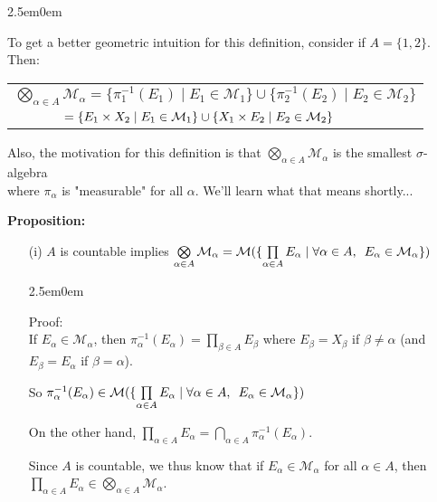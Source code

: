 \documentclass{book}
\newcommand{\hTwo}{%
\color{MidnightBlue}%
   \fontsize{13}{15}\selectfont%
}
\newcommand{\hThree}{%
   \color{PineGreen!85!Orange}
   \fontsize{12}{14}\selectfont%
}
\newcommand{\myComment}{%
   \color{RawerSienna}%
   \fontsize{12}{14}\selectfont%
}
\newenvironment{myIndent}{%
   \begin{adjustwidth}{2.5em}{0em}%
}{%
   \end{adjustwidth}%
}
\newcommand{\blab}[1]{\textbf{#1}}
\newcommand{\myHS}{ \hspace{0.5em}}
\newcommand{\retTwo}{\hfill\bigbreak}
\begin{document}
\begin{myIndent}\myComment
   To get a better geometric intuition for this definition, consider if $A = \{1, 2\}$. Then:\\ [-8pt]

   {\centering 
   \begin{tabular}{l}
      $\bigotimes\limits_{\alpha \in A}\mathcal{M}_\alpha = \{\pi_1^{-1}(E_1) \mid E_1 \in \mathcal{M}_1\} \cup \{\pi_2^{-1}(E_2) \mid E_2 \in \mathcal{M}_2\}$ \\ [-4pt]$\hphantom{\bigotimes\limits_{\alpha \in A}\mathcal{M}_\alpha} = \{E_1 \times X_2 \mid E_1 \in \mathcal{M}_1\} \cup \{X_1 \times E_2 \mid E_2 \in \mathcal{M}_2\}$
   \end{tabular} \retTwo\par}

   Also, the motivation for this definition is that $\bigotimes\limits_{\alpha \in A}\mathcal{M}_\alpha$ is the smallest $\sigma$-algebra\\ [-2pt] where $\pi_\alpha$ is "measurable" for all $\alpha$. We'll learn what that means shortly...\retTwo

   \hTwo
   \blab{Proposition:}
   \begin{itemize}
      \item[(i)] $A$ is countable implies $\bigotimes\limits_{\alpha \in A}\mathcal{M}_\alpha = \mathcal{M}(\{\prod\limits_{\alpha \in A}E_\alpha \mid \forall \alpha \in A, \myHS E_\alpha \in \mathcal{M}_\alpha\})$
      
      \begin{myIndent}\hThree
         Proof:\\
         If $E_\alpha \in \mathcal{M}_\alpha$, then $\pi_\alpha^{-1}(E_\alpha) = \prod\limits_{\beta \in A}E_\beta$ where $E_\beta = X_\beta$ if $\beta \neq \alpha$ (and\\ [-8pt] $E_\beta = E_\alpha$ if $\beta = \alpha$).\retTwo
         
         So $\pi_\alpha^{-1}(E_\alpha) \in \mathcal{M}(\{\prod\limits_{\alpha \in A}E_\alpha \mid \forall \alpha \in A,\myHS E_\alpha \in \mathcal{M}_\alpha\})$

         On the other hand, $\prod\limits_{\alpha \in A}E_\alpha = \bigcap\limits_{\alpha \in A}\pi_\alpha^{-1}(E_\alpha)$.\retTwo
         
         Since $A$ is countable, we thus know that if $E_\alpha \in \mathcal{M}_\alpha$ for all $\alpha \in A$, then\\ $\prod\limits_{\alpha \in A}E_\alpha  \in \bigotimes\limits_{\alpha \in A}\mathcal{M}_\alpha$.\newpage
      \end{myIndent}


\end{itemize}
\end{myIndent}
\end{document}
